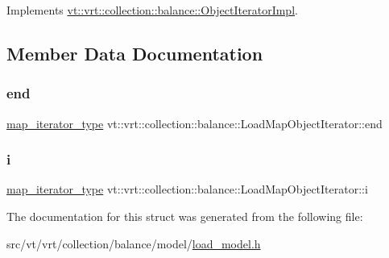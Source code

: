 Implements \hyperlink{structvt_1_1vrt_1_1collection_1_1balance_1_1_object_iterator_impl_ab59b65c6a22626b6d2d3ab283309ac1f}{vt\+::vrt\+::collection\+::balance\+::\+Object\+Iterator\+Impl}.



\subsection{Member Data Documentation}
\mbox{\label{structvt_1_1vrt_1_1collection_1_1balance_1_1_load_map_object_iterator_a61889f49ea85bc3e6264e7ff78964311}} 
\subsubsection{\texorpdfstring{end}{end}}
{\footnotesize\ttfamily \hyperlink{structvt_1_1vrt_1_1collection_1_1balance_1_1_load_map_object_iterator_ae487f542c8875bc4cd60da54da5545ce}{map\+\_\+iterator\+\_\+type} vt\+::vrt\+::collection\+::balance\+::\+Load\+Map\+Object\+Iterator\+::end}

\mbox{\label{structvt_1_1vrt_1_1collection_1_1balance_1_1_load_map_object_iterator_a919c8b6baaa2d0de90ff61fb8e7adcd1}} 
\subsubsection{\texorpdfstring{i}{i}}
{\footnotesize\ttfamily \hyperlink{structvt_1_1vrt_1_1collection_1_1balance_1_1_load_map_object_iterator_ae487f542c8875bc4cd60da54da5545ce}{map\+\_\+iterator\+\_\+type} vt\+::vrt\+::collection\+::balance\+::\+Load\+Map\+Object\+Iterator\+::i}



The documentation for this struct was generated from the following file\+:\begin{DoxyCompactItemize}
\item 
src/vt/vrt/collection/balance/model/\hyperlink{load__model_8h}{load\+\_\+model.\+h}\end{DoxyCompactItemize}
